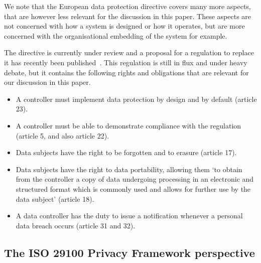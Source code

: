 We note that the European data protection directive covers many more aspects, that are however less relevant for the discussion in this paper. These aspects are not concerned with how a system is designed or how it operates, but are more concerned with the organisational embedding of the system for example.

The directive is currently under review and a proposal for a regulation to replace it has recently been published~\cite{COM(2012)11}. This regulation is still in flux and under heavy debate, but it contains the following rights and obligations that are relevant for our discussion in this paper.
\begin{itemize}
\item A controller must implement data protection by design and by default (article 23).
\item A controller must be able to demonstrate compliance with the regulation (article 5, and also article 22).
\item Data subjects have the right to be forgotten and to erasure (article 17).
\item Data subjects have the right to data portability, allowing them `to obtain from the controller a copy of data undergoing processing in an electronic and structured format which is commonly used and allows for further use by the data subject' (article 18).
\item A data controller has the duty to issue a notification whenever a personal data breach occurs (article 31 and 32).
\end{itemize}

\subsection{The ISO 29100 Privacy Framework perspective}

